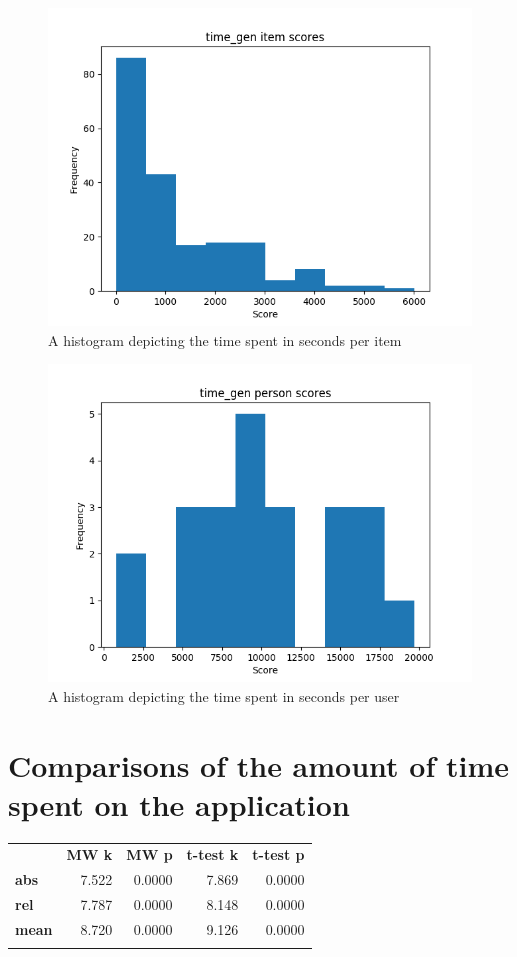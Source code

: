 \begin{figure}
    \centering
    \includegraphics[width=.7\textwidth]{img/time_gen_diff.png}
    \caption{A histogram depicting the time spent in seconds per item} 
    \label{fig:time_gen_diff}
\end{figure}
\begin{figure}
    \centering
    \includegraphics[width=.7\textwidth]{img/time_gen_abil.png}
    \caption{A histogram depicting the time spent in seconds per user}
    \label{fig:time_gen_abil}
\end{figure}

\section{Comparisons of the amount of time spent on the application}

\begin{longtable}[c]{@{}lrrrr@{}}
\toprule\addlinespace
& \textbf{MW k} & \textbf{MW p} &
\textbf{t-test k} & \textbf{t-test p}
\\\addlinespace
\midrule
\textbf{abs} & 7.522 & 0.0000 & 7.869 & 0.0000
\\\addlinespace
\textbf{rel} & 7.787 & 0.0000 & 8.148 & 0.0000
\\\addlinespace
\textbf{mean} & 8.720 & 0.0000 & 9.126 & 0.0000
\\\addlinespace
\bottomrule
    \label{tab:time_comp}
\end{longtable}

